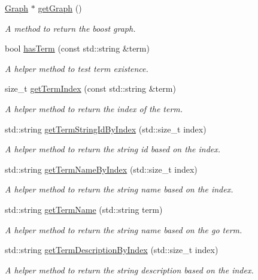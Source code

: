 \begin{DoxyCompactItemize}
\hyperlink{classGoGraph_aae4ae00d4785dcee01a514feb768f380}{Graph} $\ast$ \hyperlink{classGoGraph_a752d7576d649cdc0befa982ca5c3ea98}{get\+Graph} ()
\begin{DoxyCompactList}\small\item\em A method to return the boost graph. \end{DoxyCompactList}\item 
bool \hyperlink{classGoGraph_af8ee7588b17f58717afc13acb0a33435}{has\+Term} (const std\+::string \&term)
\begin{DoxyCompactList}\small\item\em A helper method to test term existence. \end{DoxyCompactList}\item 
size\+\_\+t \hyperlink{classGoGraph_ae7b982d3f564013844d8046e732cef76}{get\+Term\+Index} (const std\+::string \&term)
\begin{DoxyCompactList}\small\item\em A helper method to return the index of the term. \end{DoxyCompactList}\item 
std\+::string \hyperlink{classGoGraph_aa885bffcce6c156769236ca2af9a453e}{get\+Term\+String\+Id\+By\+Index} (std\+::size\+\_\+t index)
\begin{DoxyCompactList}\small\item\em A helper method to return the string id based on the index. \end{DoxyCompactList}\item 
std\+::string \hyperlink{classGoGraph_aa046ee2d278114b6c28f4d5be71b81f0}{get\+Term\+Name\+By\+Index} (std\+::size\+\_\+t index)
\begin{DoxyCompactList}\small\item\em A helper method to return the string name based on the index. \end{DoxyCompactList}\item 
std\+::string \hyperlink{classGoGraph_a175dab9ef8da6c3f06e8f71f21699cf6}{get\+Term\+Name} (std\+::string term)
\begin{DoxyCompactList}\small\item\em A helper method to return the string name based on the go term. \end{DoxyCompactList}\item 
std\+::string \hyperlink{classGoGraph_aed5db44d61c949aed72482ee41438856}{get\+Term\+Description\+By\+Index} (std\+::size\+\_\+t index)
\begin{DoxyCompactList}\small\item\em A helper method to return the string description based on the index. \end{DoxyCompactList}\item 

\end{DoxyCompactItemize}
